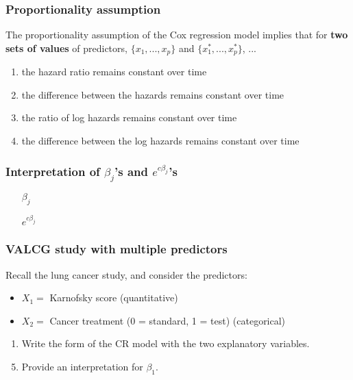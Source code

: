 \begin{frame}
\frametitle{Proportionality assumption}
\begin{clicker}{The proportionality assumption of the Cox regression model implies that for \textbf{two sets of values} of predictors, $\{x_1,...,x_p\}$ and $\{x_1^*,...,x_p^*\}$, ...}
\begin{enumerate}
\item the hazard ratio remains constant over time
\item the difference between the hazards remains constant over time
\item the ratio of log hazards remains constant over time
\item the difference between the log hazards remains constant over time
\end{enumerate}
\end{clicker}
\end{frame}

\begin{frame}
\frametitle{Interpretation of ${\beta}_j$'s and $e^{c\beta_j}$'s}
\begin{itemize}
\item[${\beta}_j$]
\item[]
\item[]
\item[]
\item[]
\item[]
\item[]
\item[]
\item[$e^{c\beta_j}$]
\item[]
\item[]
\item[]
\item[]
\item[]
\item[]
\item[]
\end{itemize}
\end{frame}

\begin{frame}
\frametitle{VALCG study with multiple predictors}
Recall the lung cancer study, and consider the predictors:
\begin{itemize}
\item $X_1=$ Karnofsky score (quantitative)
\item $X_2=$ Cancer treatment (0 = standard, 1 = test) (categorical)
\end{itemize}
\begin{enumerate}
\item Write the form of the CR model with the two explanatory variables.
\item[]
\item[]
\item[]
\item Provide an interpretation for $\beta_1$.
\item[]
\item[]
\item[]
\item[]
\item[]
\end{enumerate}
\end{frame}

